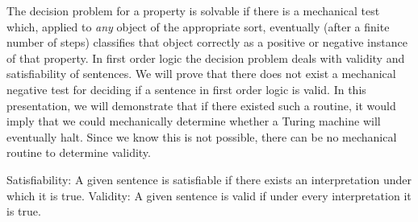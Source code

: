 The decision problem for a property is solvable if there is a mechanical test which, applied to \textit{any} object of the appropriate sort, eventually (after a finite number of steps) classifies that object correctly as a positive or negative instance of that property. In first order logic the decision problem deals with validity and satisfiability of sentences. We will prove that there does not exist a mechanical negative test for deciding if a sentence in first order logic is valid. In this presentation, we will demonstrate that if there existed such a routine, it would imply that we could mechanically determine whether a Turing machine will eventually halt. Since we know this is not possible, there can be no mechanical routine to determine validity.

Satisfiability: A given sentence is satisfiable if there exists an interpretation under which it is true.
Validity: A given sentence is valid if under every interpretation it is true.

